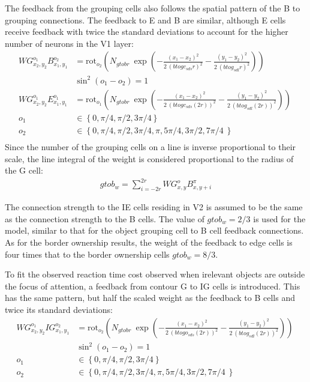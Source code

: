 The feedback from the grouping cells also follows the spatial pattern of the B to grouping connections. The feedback to E and B are similar, although E cells receive feedback with twice the standard deviations to account for the higher number of neurons in the V1 layer:
\begin{align}
	WG^{o_1}_{x_2,y_2}B^{o_2}_{x_1,y_1}&=\text{rot}_{o_2}\left(N_{gtobr}\: \exp\left(-\frac{(x_1-x_2)^2}{2\: (btogc_{sds} r)^2}
	-\frac{(y_1-y_2)^2}{2\: (btog_{sdl} r)^2}\right)\right)\ \nonumber\\
		        	 &\sin^2(o_1-o_2) = 1 \nonumber\\
	WG^{o_1}_{x_2,y_2}E^{o_1}_{x_1,y_1}&=\text{rot}_{o_1}\left(N_{gtobr}\: \exp\left(-\frac{(x_1-x_2)^2}{2\: (btogc_{sds} (2r))^2}
	-\frac{(y_1-y_2)^2}{2\: (btog_{sdl} (2r))^2}\right)\right)\ \nonumber\\ 
		 o_1&\in \left\{0,\pi/4,\pi/2,3\pi/4 \right\} \nonumber\\
	 o_2&\in \left\{0,\pi/4,\pi/2,3\pi/4,\pi,5\pi/4,3\pi/2,7\pi/4\ \right\} \nonumber\\
\end{align}
Since the number of the grouping cells on a line is
inverse proportional to their scale, the line integral of the weight is considered proportional to the radius of the G cell:
\begin{align}
	gtob_w=\sum^{2r}_{i=-2r} WG^{o}_{x,y}B^{\pi}_{x,y+i}
\end{align}

The connection strength to the IE cells residing in V2 is assumed to be the same as the connection strength to the B cells. The value of $gtob_w=2/3$ is used for the model, similar to that for the object grouping cell to B cell feedback connections. As for the border ownership results, the weight of the feedback to edge cells is four times that to the border ownership cells $gtob_w=8/3$.

To fit the observed reaction time cost observed when irelevant objects
are outside the focus of attention, a feedback
from contour G to IG cells is
introduced. This has the same pattern, but half the scaled weight as the
feedback to B cells and twice its standard
deviations: 
\begin{align}
	WG^{o_1}_{x_2,y_2}IG^{o_2}_{x_1,y_1}&=\text{rot}_{o_2}\left(N_{gtobr}\: \exp\left(-\frac{(x_1-x_2)^2}{2\: (btogo_{sds} (2r))^2}
	-\frac{(y_1-y_2)^2}{2\: (btog_{sdl} (2r))^2}\right)\right) \  \nonumber\\
	   	 &\sin^2(o_1-o_2) = 1 \nonumber\\
		 o_1&\in \left\{0,\pi/4,\pi/2,3\pi/4 \right\} \nonumber\\
	 o_2&\in \left\{0,\pi/4,\pi/2,3\pi/4,\pi,5\pi/4,3\pi/2,7\pi/4\ \right\} \nonumber\\
\end{align}

